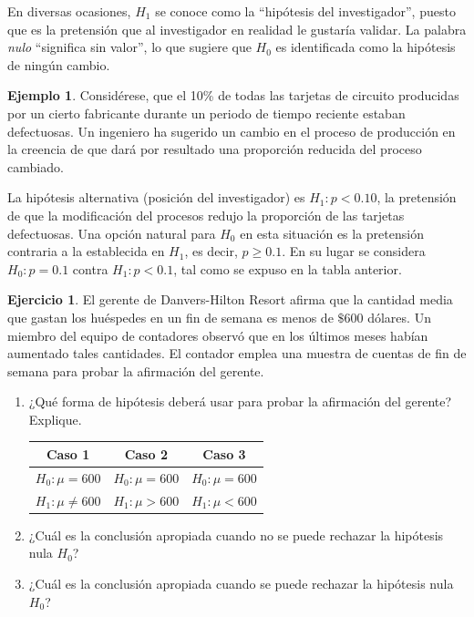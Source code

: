 \documentclass[
  11pt,
]{book}
\providecommand{\tightlist}{%
  \setlength{\itemsep}{0pt}\setlength{\parskip}{0pt}}
\theoremstyle{definition}
\theoremstyle{definition}
\newtheorem{example}{Ejemplo}[chapter]
\theoremstyle{definition}
\newtheorem{exercise}{Ejercicio}[chapter]
\theoremstyle{definition}
\theoremstyle{remark}
\begin{document}
En diversas ocasiones, \(H_1\) se conoce como la ``hipótesis del investigador'', puesto que es la pretensión que al investigador en realidad le gustaría validar. La palabra \emph{nulo} ``significa sin valor'', lo que sugiere que \(H_0\) es identificada como la hipótesis de ningún cambio.

\begin{example}
Considérese, que el 10\% de todas las tarjetas de circuito producidas por un cierto fabricante durante un periodo de tiempo reciente estaban defectuosas. Un ingeniero ha sugerido un cambio en el proceso de producción en la creencia de que dará por resultado una proporción reducida del proceso cambiado.

La hipótesis alternativa (posición del investigador) es \(H_1: p <0.10\), la pretensión de que la modificación del procesos redujo la proporción de las tarjetas defectuosas. Una opción natural para \(H_0\) en esta situación es la pretensión contraria a la establecida en \(H_1\), es decir, \(p\geq 0.1\). En su lugar se considera \(H_0: p = 0.1\) contra \(H_1: p < 0.1\), tal como se expuso en la tabla anterior.
\end{example}

\begin{exercise}

El gerente de Danvers-Hilton Resort afirma que la cantidad media que gastan los huéspedes en un fin de semana es menos de \(\$600\) dólares. Un miembro del equipo de contadores observó que en los últimos meses habían aumentado tales cantidades. El contador emplea una muestra de cuentas de fin de semana para probar la afirmación del gerente.

\begin{enumerate}
\def\labelenumi{\alph{enumi}.}
\tightlist
\item
  ¿Qué forma de hipótesis deberá usar para probar la afirmación del gerente? Explique.

  \begin{table}[H]
  \centering
  \begin{tabular}[t]{ccc}
  \toprule
  Caso 1 & Caso 2 & Caso 3\\
  \midrule
  $H_0: \mu = 600$ & $H_0: \mu = 600$ & $H_0: \mu = 600$\\
  $H_1: \mu \neq 600$ & $H_1: \mu > 600$ & $H_1:\mu < 600$\\
  \bottomrule
  \end{tabular}
  \end{table}
\item
  ¿Cuál es la conclusión apropiada cuando no se puede rechazar la hipótesis nula \(H_0\)?
\item
  ¿Cuál es la conclusión apropiada cuando se puede rechazar la hipótesis nula \(H_0\)?
\end{enumerate}

\end{exercise}
\end{document}
